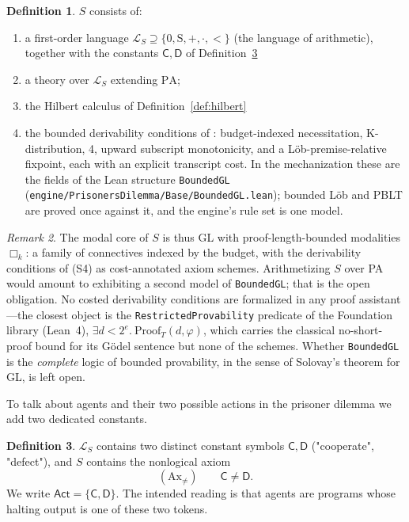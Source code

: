 \documentclass[11pt]{article}
\theoremstyle{definition}
\newtheorem{definition}{Definition}[section]
\theoremstyle{plain}
\theoremstyle{remark}
\newtheorem{remark}[definition]{Remark}
\newcommand{\Lang}{\mathcal{L}}
\newcommand{\bx}[1]{\Box_{#1}}
\newcommand{\Cact}{\mathsf{C}}
\newcommand{\Dact}{\mathsf{D}}
\newcommand{\Act}{\mathsf{Act}}
\begin{document}
\begin{definition}\label{def:S}
$S$ consists of:
\begin{enumerate}[label=(S\arabic*),leftmargin=2.6em]
\item a first-order language $\Lang_S\supseteq\{0,\mathrm{S},+,\cdot,<\}$ (the language of arithmetic), together with the constants $\mathsf{C},\mathsf{D}$ of
  Definition~\ref{def:actions}
\item a theory over $\Lang_S$ extending $\mathrm{PA}$;
\item the Hilbert calculus of Definition~\ref{def:hilbert}
\item the bounded derivability conditions of \cite{critch2019}: budget-indexed necessitation,
  K-distribution, 4, upward subscript monotonicity, and a L\"ob-premise-relative fixpoint,
  each with an explicit transcript cost. In the mechanization these are the fields of the
  Lean structure \texttt{BoundedGL} (\texttt{engine/PrisonersDilemma/Base/BoundedGL.lean});
  bounded L\"ob and PBLT are proved once against it, and the engine's rule set is one model.
\end{enumerate}
\end{definition}


\begin{remark}\label{rem:boundedgl}
  The modal core of $S$ is thus GL with proof-length-bounded modalities $\bx{k}$: a family of
  connectives indexed by the budget, with the derivability conditions of (S4) as cost-annotated
  axiom schemes. Arithmetizing $S$ over PA would amount to exhibiting a second model of
  \texttt{BoundedGL}; that is the open obligation. No costed derivability conditions are
  formalized in any proof assistant---the closest object is the \texttt{RestrictedProvability}
  predicate of the Foundation library (Lean~4), $\exists d<2^e.\ \mathrm{Proof}_T(d,\varphi)$,
  which carries the classical no-short-proof bound for its G\"odel sentence but none of the
  schemes. Whether \texttt{BoundedGL} is the \emph{complete} logic of bounded provability, in
  the sense of Solovay's theorem for GL, is left open.
\end{remark}


To talk about agents and their two possible actions in the prisoner dilemma we add two dedicated constants.

\begin{definition}\label{def:actions}
$\Lang_S$ contains two distinct constant symbols $\Cact,\Dact$ ("cooperate", "defect"), and $S$ contains the nonlogical axiom
\[
(\mathrm{Ax}_{\neq})\qquad \Cact \neq \Dact .
\]
We write $\Act=\{\Cact,\Dact\}$. The intended reading is that agents are programs whose halting output is one of these two tokens.
\end{definition}
\end{document}
